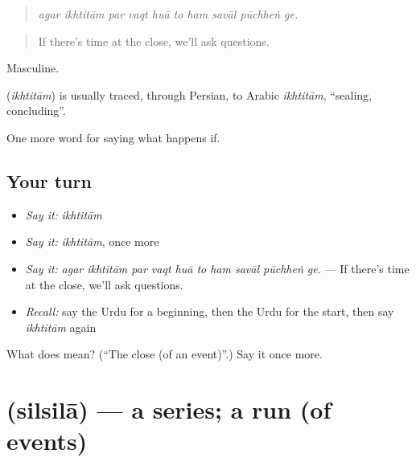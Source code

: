 \begin{quote}
         
\end{quote}

\begin{quote}
\emph{agar ikhtitām par vaqt huā to ham savāl pūchheṅ ge.}
\end{quote}

\begin{quote}
If there's time at the close, we'll ask questions.
\end{quote}

Masculine.

\begin{cousinweb}
\textbf{} (\emph{ikhtitām}) is usually traced, through Persian, to Arabic \emph{ikhtitām}, \textquotedblleft{}sealing, concluding\textquotedblright{}.
\end{cousinweb}

\begin{grammarlens}[title={What you've built}]
One more word for saying what happens if.
\end{grammarlens}

\subsection*{Your turn}
\begin{itemize}
\raggedright
  \item \emph{Say it:} \emph{ikhtitām}
  \item \emph{Say it:} \emph{ikhtitām}, once more
  \item \emph{Say it:} \emph{agar ikhtitām par vaqt huā to ham savāl pūchheṅ ge.} — If there's time at the close, we'll ask questions.
  \item \emph{Recall:} say the Urdu for a beginning, then the Urdu for the start, then say \emph{ikhtitām} again
\end{itemize}

\begin{tcolorbox}[breakable,colback=teal!4,colframe=teal!35!black,title={Before you move on}]
What does  mean? (\textquotedblleft{}The close (of an event)\textquotedblright{}.) Say it once more.
\end{tcolorbox}
\section[\texorpdfstring{\ur{سلسلہ} (silsilā)}{سلسلہ (silsilā)}]{ (silsilā) — a series; a run (of events)}

